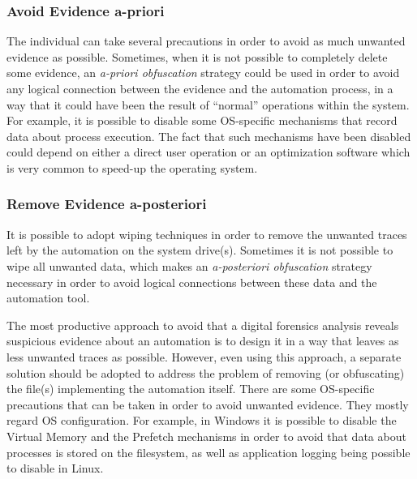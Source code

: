 \documentclass[runningheads]{llncs}
\begin{document}
\subsubsection{Avoid Evidence a-priori} 
The individual can take several precautions in order to avoid as much
unwanted evidence as possible. Sometimes, when it is not possible to
completely delete some evidence, an \textit{a-priori obfuscation} strategy could be used in order to avoid any logical connection between the
evidence and the automation process, in a way that it
could have been the result of ``normal'' operations within the system.
For example, it is possible to disable some OS-specific mechanisms that
record data about process execution.
The fact that such mechanisms have been disabled could depend on either a
direct user operation or an optimization software which is very common to speed-up the operating system.
 
 \subsubsection{Remove Evidence a-posteriori}
 It is possible to adopt wiping techniques
 in order to remove the unwanted traces left by the automation on the system drive(s). Sometimes it is not possible to wipe all unwanted data, which makes  
 an \textit{a-posteriori obfuscation} strategy necessary in order to avoid logical connections between these data and the automation tool.
\medskip

The most productive approach to avoid that a digital forensics analysis reveals suspicious evidence about an automation is to design it in a way that leaves as less unwanted traces as possible.
However, even using this approach, a separate solution should be adopted to address the problem of removing (or obfuscating) the file(s) implementing the automation itself.
There are some OS-specific precautions that can be taken in order to avoid unwanted evidence. They mostly regard OS configuration. For example, in Windows it is possible to disable the Virtual Memory and the Prefetch mechanisms in order to avoid that data about processes is stored on the filesystem, as well as application logging being possible to disable in Linux.
\end{document}
